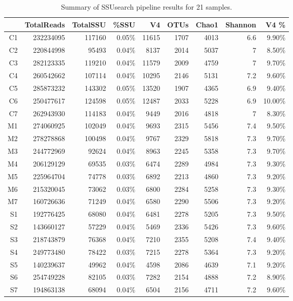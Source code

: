 \documentclass[]{msu-thesis}
\begin{document}
\begin{table}[htbp]
  \centering
  \caption[SSUsearch pipeline results]{Summary of SSUsearch pipeline results for 21 samples.}
    \begin{tabular}{|rrrrrrrrr|}
    \toprule
          & TotalReads & TotalSSU & \%SSU & V4    & OTUs  & Chao1 & Shannon & V4 \% \\
    \midrule
    C1    & 232234095 & 117160 & 0.05\% & 11615 & 1707  & 4013  & 6.6   & 9.90\% \\
    C2    & 220844998 & 95493 & 0.04\% & 8137  & 2014  & 5037  & 7     & 8.50\% \\
    C3    & 282123335 & 119210 & 0.04\% & 11579 & 2009  & 4759  & 7     & 9.70\% \\
    C4    & 260542662 & 107114 & 0.04\% & 10295 & 2146  & 5131  & 7.2   & 9.60\% \\
    C5    & 285873232 & 143302 & 0.05\% & 13520 & 1907  & 4365  & 6.9   & 9.40\% \\
    C6    & 250477617 & 124598 & 0.05\% & 12487 & 2033  & 5228  & 6.9   & 10.00\% \\
    C7    & 262943930 & 114183 & 0.04\% & 9449  & 2016  & 4818  & 7     & 8.30\% \\
    M1    & 274060925 & 102049 & 0.04\% & 9693  & 2315  & 5456  & 7.4   & 9.50\% \\
    M2    & 278278868 & 100498 & 0.04\% & 9767  & 2329  & 5818  & 7.3   & 9.70\% \\
    M3    & 244772969 & 92624 & 0.04\% & 8963  & 2245  & 5358  & 7.3   & 9.70\% \\
    M4    & 206129129 & 69535 & 0.03\% & 6474  & 2289  & 4984  & 7.3   & 9.30\% \\
    M5    & 225964704 & 74778 & 0.03\% & 6892  & 2213  & 4860  & 7.3   & 9.20\% \\
    M6    & 215320045 & 73062 & 0.03\% & 6800  & 2284  & 5258  & 7.3   & 9.30\% \\
    M7    & 160726636 & 71249 & 0.04\% & 6580  & 2290  & 5506  & 7.3   & 9.20\% \\
    S1    & 192776425 & 68080 & 0.04\% & 6481  & 2278  & 5205  & 7.3   & 9.50\% \\
    S2    & 143660127 & 57229 & 0.04\% & 5469  & 2336  & 5426  & 7.3   & 9.60\% \\
    S3    & 218743879 & 76368 & 0.04\% & 7210  & 2355  & 5208  & 7.4   & 9.40\% \\
    S4    & 249773480 & 78422 & 0.03\% & 7215  & 2278  & 5364  & 7.3   & 9.20\% \\
    S5    & 140239637 & 49962 & 0.04\% & 4598  & 2086  & 4639  & 7.1   & 9.20\% \\
    S6    & 254749228 & 82105 & 0.03\% & 7282  & 2154  & 4888  & 7.2   & 8.90\% \\
    S7    & 194863138 & 68094 & 0.04\% & 6504  & 2156  & 4711  & 7.2   & 9.60\% \\
    \bottomrule
    \end{tabular}%
  \label{tab:chap4TabS2}%
\end{table}%
\end{document}
